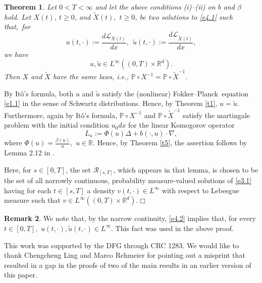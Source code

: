 \documentclass[12pt]{article}
\def\rrd{{\rr^d}}
\def\n{\noindent }
\def\D{{\Delta}}
\def\D{{\Delta}}
\def\FP{Fokker--Planck}
\newtheorem{theorem}{Theorem}[section]
\theoremstyle{definition}
\newtheorem{remark}[theorem]{Remark}
\def\1{^{-1}}
\def\rr{{\mathbb{R}}}
\def\9{{\infty}}
\def\b{{\beta}}
\def\wt{\widetilde}
\def\D{{\Delta}}
\def\n{\noindent }
\begin{document}
\begin{theorem}\label{t4.1} Let $0<T<\9$ and let the above conditions {\rm(i)--(ii)} on  $b$ and $\b$ hold. Let $X(t)$, $t\ge0$, and $\wt X(t),$ $t\ge0$, be  two solutions to \eqref{e4.1} such that,~for 
$$u(t,\cdot):=\frac{d\mathcal{L}_{X(t)}}{dx},\ \ \wt u(t,\cdot):=\frac{d\mathcal{L}_{\wt X(t)}}{dx},$$we have
\begin{equation}\label{e4.2}
u,\wt u\in L^\9((0,T)\times\rrd).\end{equation}Then $X$ and $\wt X$ have the same laws, i.e., $\mathbb{P}\circ X\1=\mathbb{P}\circ\wt X^{-1}.$\end{theorem}

\n{\bf Proof.} By It\^o's formula, both $u$ and $\wt u$ satisfy the (nonlinear) \FP\ equation \eqref{e1.1} in the sense of Schwartz distributions. Hence, by Theorem \ref{t1}, $u=\wt u$. Furthermore, again by It\^o's formula, $\mathbb{P}\circ X\1$ and $\mathbb{P}\circ\wt X\1$ satisfy the martingale problem with the initial condition $u_0dx$ for the linear Komogorov operator
$$L_u:=\Phi(u)\D+b(\cdot,u)\cdot\nabla,$$where $\Phi(u)=\frac{\b(u)}u,$ $u\in\rr.$ Hence, by Theorem \ref{t5}, the assertion follows by Lemma 2.12 in \cite{4}. 

Here, for $s\in[0,T]$, the set $\mathcal{R}_{[s,T]}$, which appears in that lemma, is chosen to be the set of all narrowly continuous, probability measure-valued solutions of \eqref{e3.1} having for each $t\in[s,T]$ a density \mbox{$v(t,\cdot)\in L^\9$} with respect to  Lebesgue measure such that \mbox{$v\in L^\9((0,T)\times\rrd).$}\hfill$\Box$



\begin{remark}\label{e4.2}\rm We note that, by the narrow continuity, \eqref{e4.2} implies that, for every $t\in[0,T],$ $u(t,\cdot),\wt u(t,\cdot)\in L^\9$. This fact was used in the above proof.
\end{remark}

\n{\bf Acknowledgements.} This work was supported by the DFG through CRC 1283. We would like to thank Chengcheng Ling and Marco Rehmeier for pointing out a misprint that resulted in a gap in the proofs of two of the main results in an earlier version of this paper.
\end{document}
